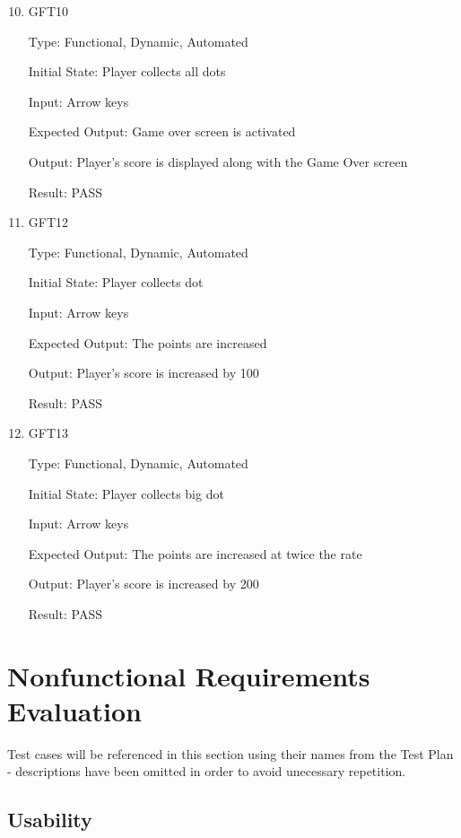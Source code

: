 \documentclass[12pt, titlepage]{article}
\begin{document}
\begin{enumerate}
\setcounter{enumi}{9}
\item{\label{gft10}{GFT10}\\}

Type: Functional, Dynamic, Automated
					
Initial State: Player collects all dots
					
Input: Arrow keys
					
Expected Output: Game over screen is activated

Output: Player's score is displayed along with the Game Over screen

Result: PASS
\setcounter{enumi}{11}
\item{\label{gft12}{GFT12}\\}

Type: Functional, Dynamic, Automated
					
Initial State: Player collects dot
					
Input: Arrow keys
					
Expected Output: The points are increased

Output: Player's score is increased by 100

Result: PASS

\item{\label{gft13}{GFT13}\\}

Type: Functional, Dynamic, Automated
					
Initial State: Player collects big dot
					
Input: Arrow keys
					
Expected Output: The points are increased at twice the rate

Output: Player's score is increased by 200

Result: PASS

\end{enumerate}

\section{Nonfunctional Requirements Evaluation}

Test cases will be referenced in this section using their names from the Test Plan - descriptions have been omitted in order to avoid unecessary repetition.

\subsection{Usability}
\end{document}
